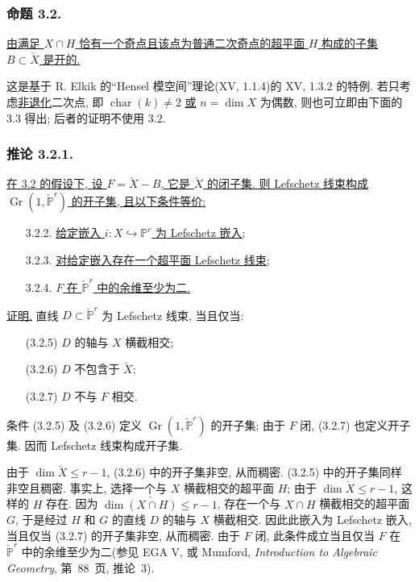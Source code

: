 \subsubsection*{命题 3.2.}
\underline{由满足 $X\cap H$ 恰有一个奇点且该点为普通二次奇点的超平面 $H$ 构成的子集 $B\subset\check X$ 是开的.}

这是基于 R. Elkik 的“Hensel 模空间”理论(XV, 1.1.4)的 XV, 1.3.2 的特例. 若只考虑\underline{非退化}二次点, 即 $\operatorname{char}(k)\ne2$ \underline{或} $n=\dim X$ 为偶数, 则也可立即由下面的 3.3 得出; 后者的证明不使用 3.2.

\subsubsection*{推论 3.2.1.}
\underline{在 3.2 的假设下, 设 $F=\check X-B$, 它是 $\check X$ 的闭子集. 则 Lefschetz 线束构成 $\operatorname{Gr}(1,\check{\mathbb P}^{r})$ 的开子集, 且以下条件等价:}
\begin{enumerate}
\item[3.2.2.] \underline{给定嵌入 $i:X\hookrightarrow\mathbb P^r$ 为 Lefschetz 嵌入;}
\item[3.2.3.] \underline{对给定嵌入存在一个超平面 Lefschetz 线束;}
\item[3.2.4.] \underline{$F$ 在 $\check{\mathbb P}^{r}$ 中的余维至少为二.}
\end{enumerate}

\noindent\underline{证明.}
直线 $D\subset\check{\mathbb P}^{r}$ 为 Lefschetz 线束, 当且仅当:
\begin{enumerate}
\item[(3.2.5)] $D$ 的轴与 $X$ 横截相交;
\item[(3.2.6)] $D$ 不包含于 $\check X$;
\item[(3.2.7)] $D$ 不与 $F$ 相交.
\end{enumerate}
条件 (3.2.5) 及 (3.2.6) 定义 $\operatorname{Gr}(1,\check{\mathbb P}^{r})$ 的开子集; 由于 $F$ 闭, (3.2.7) 也定义开子集. 因而 Lefschetz 线束构成开子集.

由于 $\dim\check X\leq r-1$, (3.2.6) 中的开子集非空, 从而稠密. (3.2.5) 中的开子集同样非空且稠密. 事实上, 选择一个与 $X$ 横截相交的超平面 $H$; 由于 $\dim\check X\leq r-1$, 这样的 $H$ 存在. 因为 $\dim\check{(X\cap H)}\leq r-1$, 存在一个与 $X\cap H$ 横截相交的超平面 $G$, 于是经过 $H$ 和 $G$ 的直线 $D$ 的轴与 $X$ 横截相交. 因此此嵌入为 Lefschetz 嵌入, 当且仅当 (3.2.7) 的开子集非空, 从而稠密. 由于 $F$ 闭, 此条件成立当且仅当 $F$ 在 $\check{\mathbb P}^{r}$ 中的余维至少为二(参见 EGA V, 或 Mumford, \emph{Introduction to Algebraic Geometry}, 第~88~页, 推论~3).

